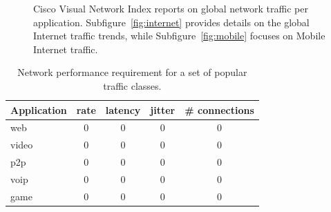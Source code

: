 \begin{figure}[ht]
\centering
{}
\caption{Cisco Visual Network Index reports on global network
  traffic per application. Subfigure~\ref{fig:internet} provides details on the global Internet
  traffic trends, while Subfigure~\ref{fig:mobile} focuses on Mobile Internet
  traffic.}
\label{fig:internet_applications}
\end{figure}


\begin{table}
\begin{center}
\begin{tabular}{ | l | c c c c | }
  \hline
  Application  & rate & latency & jitter  & \# connections \\
  \hline
  web          & 0    & 0       & 0      & 0\\
  video        & 0    & 0       & 0      & 0\\
  p2p          & 0    & 0       & 0      & 0\\
  voip         & 0    & 0       & 0      & 0\\
  game         & 0    & 0       & 0      & 0\\
  \hline
\end{tabular}
\end{center}
\caption{Network performance requirement for a set of popular traffic classes.}
\label{tbl:application_requirement}
\end{table}



